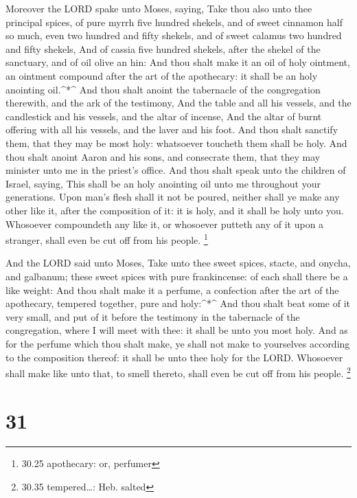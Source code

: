  Moreover the LORD spake unto Moses, saying, 
Take thou also unto thee principal spices, of pure myrrh five hundred
shekels, and of sweet cinnamon half so much, even two hundred and fifty
shekels, and of sweet calamus two hundred and fifty shekels,
 And of cassia five hundred shekels, after the shekel of
the sanctuary, and of oil olive an hin:  And thou shalt
make it an oil of holy ointment, an ointment compound after the art of
the apothecary: it shall be an holy anointing oil.\^{}*\^{}
 And thou shalt anoint the tabernacle of the congregation
therewith, and the ark of the testimony,  And the table and
all his vessels, and the candlestick and his vessels, and the altar of
incense,  And the altar of burnt offering with all his
vessels, and the laver and his foot.  And thou shalt
sanctify them, that they may be most holy: whatsoever toucheth them
shall be holy.  And thou shalt anoint Aaron and his sons,
and consecrate them, that they may minister unto me in the priest's
office.  And thou shalt speak unto the children of Israel,
saying, This shall be an holy anointing oil unto me throughout your
generations.  Upon man's flesh shall it not be poured,
neither shall ye make any other like it, after the composition of it: it
is holy, and it shall be holy unto you.  Whosoever
compoundeth any like it, or whosoever putteth any of it upon a stranger,
shall even be cut off from his people. \footnote{30.25 apothecary: or,
  perfumer}

 And the LORD said unto Moses, Take unto thee sweet spices,
stacte, and onycha, and galbanum; these sweet spices with pure
frankincense: of each shall there be a like weight:  And
thou shalt make it a perfume, a confection after the art of the
apothecary, tempered together, pure and holy:\^{}*\^{}  And
thou shalt beat some of it very small, and put of it before the
testimony in the tabernacle of the congregation, where I will meet with
thee: it shall be unto you most holy.  And as for the
perfume which thou shalt make, ye shall not make to yourselves according
to the composition thereof: it shall be unto thee holy for the LORD.
 Whosoever shall make like unto that, to smell thereto,
shall even be cut off from his people. \footnote{30.35 tempered\ldots:
  Heb. salted}

\hypertarget{section-30}{%
\section{31}\label{section-30}}

